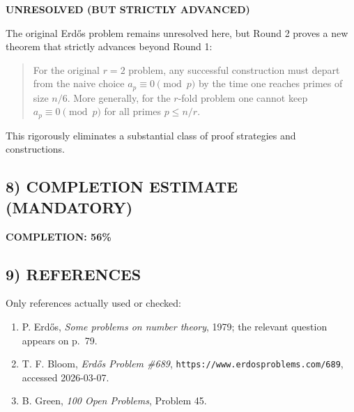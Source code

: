 \noindent\textbf{UNRESOLVED (BUT STRICTLY ADVANCED)}

\smallskip
The original Erd\H{o}s problem remains unresolved here, but Round 2 proves a new theorem that strictly advances beyond Round 1:
\begin{quote}
For the original \(r=2\) problem, any successful construction must depart from the naive choice \(a_p\equiv 0\pmod p\) by the time one reaches primes of size \(n/6\).
More generally, for the \(r\)-fold problem one cannot keep \(a_p\equiv 0\pmod p\) for all primes \(p\le n/r\).
\end{quote}
This rigorously eliminates a substantial class of proof strategies and constructions.

\subsection*{8) COMPLETION ESTIMATE (MANDATORY)}

\noindent\textbf{COMPLETION: 56\%}

\subsection*{9) REFERENCES}

Only references actually used or checked:
\begin{enumerate}
\item P. Erd\H{o}s, \emph{Some problems on number theory}, 1979; the relevant question appears on p.~79.
\item T. F. Bloom, \emph{Erd\H{o}s Problem \#689}, \texttt{https://www.erdosproblems.com/689}, accessed 2026-03-07.
\item B. Green, \emph{100 Open Problems}, Problem 45.
\end{enumerate}
